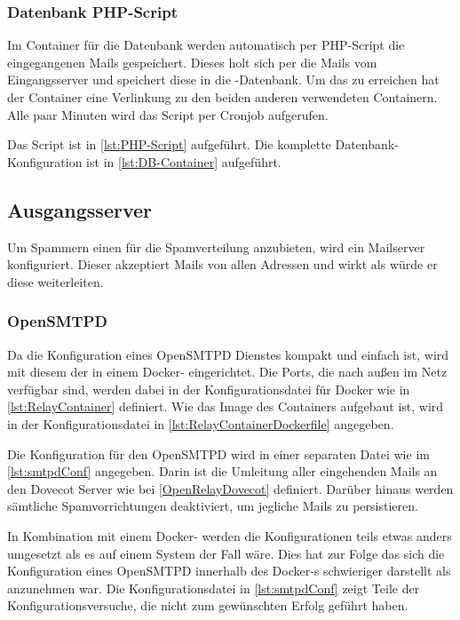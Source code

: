 \documentclass[a4paper,11pt,singlespacing]{article}
\begin{document}
		\subsubsection{Datenbank PHP-Script}\label{DB-Hook-Container}
			Im Container für die Datenbank werden automatisch per PHP-Script die eingegangenen Mails gespeichert. 
			Dieses holt sich per  die Mails vom Eingangsserver und speichert diese in die -Datenbank.
			Um das zu erreichen hat der Container eine Verlinkung zu den beiden anderen verwendeten Containern.
			Alle paar Minuten wird das Script per Cronjob aufgerufen.

			Das Script ist in \autoref{lst:PHP-Script} aufgeführt.
			Die komplette Datenbank-Konfiguration ist in \autoref{lst:DB-Container} aufgeführt.

	\subsection{Ausgangsserver}\label{sec:UmsetzungOpenRelay}
		Um Spammern einen  für die Spamverteilung anzubieten, wird ein Mailserver konfiguriert.
		Dieser akzeptiert Mails von allen Adressen und wirkt als würde er diese weiterleiten.
		
		\subsubsection{OpenSMTPD}\label{OpenRelayOpenSMTPD}
			Da die Konfiguration eines \textsf{OpenSMTPD} Dienstes kompakt und einfach ist, wird mit diesem der  in einem Docker- eingerichtet.
			Die Ports, die nach au{\ss}en im Netz verfügbar sind, werden dabei in der Konfigurationsdatei für Docker wie in \autoref{lst:RelayContainer} definiert.
			Wie das Image des Containers aufgebaut ist, wird in der Konfigurationsdatei in \autoref{lst:RelayContainerDockerfile} angegeben.

			Die Konfiguration für den \textsf{OpenSMTPD} wird in einer separaten Datei wie im \autoref{lst:smtpdConf} angegeben.
			Darin ist die Umleitung aller eingehenden Mails an den Dovecot Server wie bei \autoref{OpenRelayDovecot} definiert.
			Darüber hinaus werden sämtliche Spamvorrichtungen deaktiviert, um jegliche Mails zu persistieren.

			In Kombination mit einem Docker- werden die Konfigurationen teils etwas anders umgesetzt als es auf einem  System der Fall wäre.
			Dies hat zur Folge das sich die Konfiguration eines \textsf{OpenSMTPD} innerhalb des Docker-s schwieriger darstellt als anzunehmen war.
			Die Konfigurationsdatei in \autoref{lst:smtpdConf} zeigt Teile der Konfigurationsversuche, die nicht zum gewünschten Erfolg geführt haben.
\end{document}
